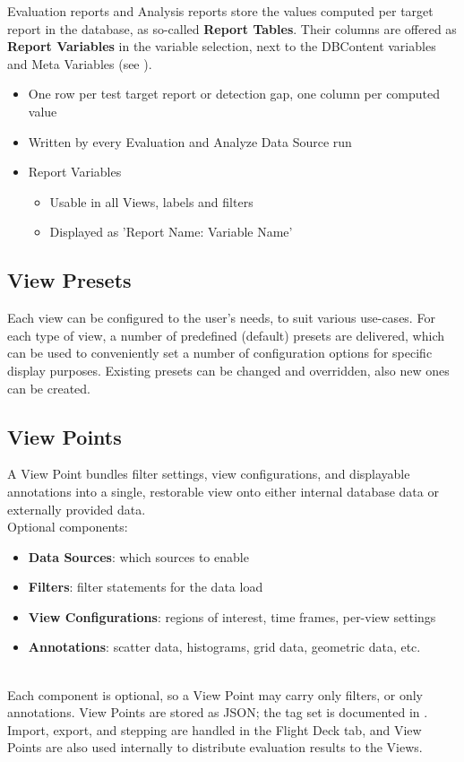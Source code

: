 Evaluation reports and Analysis reports store the values computed per target report in the database, as so-called \textbf{Report Tables}. 
Their columns are offered as \textbf{Report Variables} in the variable selection, next to the DBContent variables and Meta Variables (see ). \\

\begin{itemize}
\item One row per test target report or detection gap, one column per computed value
\item Written by every Evaluation and Analyze Data Source run
\item Report Variables
\begin{itemize}
\item Usable in all Views, labels and filters
\item Displayed as 'Report Name: Variable Name'
\end{itemize}
\end{itemize}

\subsection*{View Presets}

Each view can be configured to the user's needs, to suit various use-cases. For each type of view, a number of predefined (default) presets are delivered, which can be used to conveniently set a number of configuration options for specific display purposes. Existing presets can be changed and overridden, also new ones can be created.

\subsection*{View Points}
\label{sec:key_concepts_viewpoints}

A View Point bundles filter settings, view configurations, and displayable annotations into a single, restorable view onto either internal database data or externally provided data. \\

Optional components:

\begin{itemize}
    \item \textbf{Data Sources}: which sources to enable
    \item \textbf{Filters}: filter statements for the data load
    \item \textbf{View Configurations}: regions of interest, time frames, per-view settings
    \item \textbf{Annotations}: scatter data, histograms, grid data, geometric data, etc.
\end{itemize}
\ \\

Each component is optional, so a View Point may carry only filters, or only annotations. View Points are stored as JSON; the tag set is documented in . Import, export, and stepping are handled in the Flight Deck  tab, and View Points are also used internally to distribute evaluation results to the Views. \\
